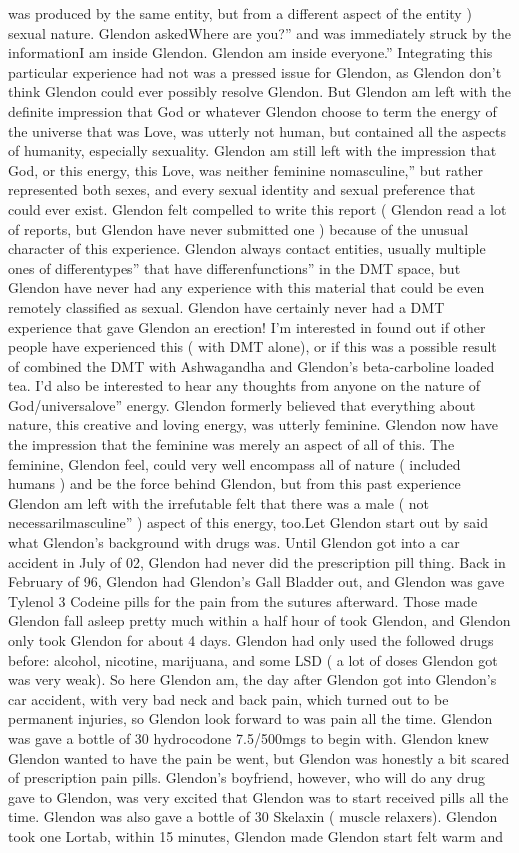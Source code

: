 \documentclass[12pt]{book}
\begin{document}
was produced by the same entity, but from a different aspect of the entity ) sexual nature. Glendon askedWhere are you?'' and was immediately struck by the informationI am inside Glendon. Glendon am inside everyone.'' Integrating this particular experience had not was a pressed issue for Glendon, as Glendon don't think Glendon could ever possibly resolve Glendon. But Glendon am left with the definite impression that God or whatever Glendon choose to term the energy of the universe that was Love, was utterly not human, but contained all the aspects of humanity, especially sexuality. Glendon am still left with the impression that God, or this energy, this Love, was neither feminine nomasculine,'' but rather represented both sexes, and every sexual identity and sexual preference that could ever exist. Glendon felt compelled to write this report ( Glendon read a lot of reports, but Glendon have never submitted one ) because of the unusual character of this experience. Glendon always contact entities, usually multiple ones of differentypes'' that have differenfunctions'' in the DMT space, but Glendon have never had any experience with this material that could be even remotely classified as sexual. Glendon have certainly never had a DMT experience that gave Glendon an erection! I'm interested in found out if other people have experienced this ( with DMT alone), or if this was a possible result of combined the DMT with Ashwagandha and Glendon's beta-carboline loaded tea. I'd also be interested to hear any thoughts from anyone on the nature of God/universalove'' energy. Glendon formerly believed that everything about nature, this creative and loving energy, was utterly feminine. Glendon now have the impression that the feminine was merely an aspect of all of this. The feminine, Glendon feel, could very well encompass all of nature ( included humans ) and be the force behind Glendon, but from this past experience Glendon am left with the irrefutable felt that there was a male ( not necessarilmasculine'' ) aspect of this energy, too.Let Glendon start out by said what Glendon's background with drugs was. Until Glendon got into a car accident in July of 02, Glendon had never did the prescription pill thing. Back in February of 96, Glendon had Glendon's Gall Bladder out, and Glendon was gave Tylenol 3 Codeine pills for the pain from the sutures afterward. Those made Glendon fall asleep pretty much within a half hour of took Glendon, and Glendon only took Glendon for about 4 days. Glendon had only used the followed drugs before: alcohol, nicotine, marijuana, and some LSD (  a lot of doses Glendon got was very weak). So here Glendon am, the day after Glendon got into Glendon's car accident, with very bad neck and back pain, which turned out to be permanent injuries, so Glendon look forward to was pain all the time. Glendon was gave a bottle of 30 hydrocodone 7.5/500mgs to begin with. Glendon knew Glendon wanted to have the pain be went, but Glendon was honestly a bit scared of prescription pain pills. Glendon's boyfriend, however, who will do any drug gave to Glendon, was very excited that Glendon was to start received pills all the time. Glendon was also gave a bottle of 30 Skelaxin ( muscle relaxers). Glendon took one Lortab, within 15 minutes, Glendon made Glendon start felt warm and 
\end{document}
